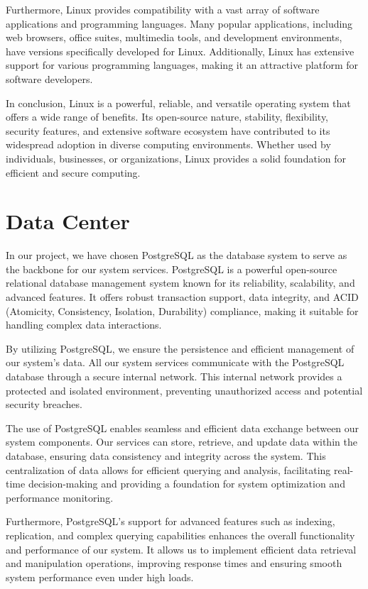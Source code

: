 \documentclass[
12pt,
oneside, 
onehalfspacing, 
nolistspacing, 
parskip, 
chapterinoneline, 
]{AASTCOMPUTER}
\begin{document}
Furthermore, Linux provides compatibility with a vast array of software applications and programming languages. Many popular applications, including web browsers, office suites, multimedia tools, and development environments, have versions specifically developed for Linux. Additionally, Linux has extensive support for various programming languages, making it an attractive platform for software developers.

In conclusion, Linux is a powerful, reliable, and versatile operating system that offers a wide range of benefits. Its open-source nature, stability, flexibility, security features, and extensive software ecosystem have contributed to its widespread adoption in diverse computing environments. Whether used by individuals, businesses, or organizations, Linux provides a solid foundation for efficient and secure computing.
\newpage
\section{Data Center}
In our project, we have chosen PostgreSQL as the database system to serve as the backbone for our system services. PostgreSQL is a powerful open-source relational database management system known for its reliability, scalability, and advanced features. It offers robust transaction support, data integrity, and ACID (Atomicity, Consistency, Isolation, Durability) compliance, making it suitable for handling complex data interactions.

By utilizing PostgreSQL, we ensure the persistence and efficient management of our system's data. All our system services communicate with the PostgreSQL database through a secure internal network. This internal network provides a protected and isolated environment, preventing unauthorized access and potential security breaches.

The use of PostgreSQL enables seamless and efficient data exchange between our system components. Our services can store, retrieve, and update data within the database, ensuring data consistency and integrity across the system. This centralization of data allows for efficient querying and analysis, facilitating real-time decision-making and providing a foundation for system optimization and performance monitoring.

Furthermore, PostgreSQL's support for advanced features such as indexing, replication, and complex querying capabilities enhances the overall functionality and performance of our system. It allows us to implement efficient data retrieval and manipulation operations, improving response times and ensuring smooth system performance even under high loads.
\end{document}
